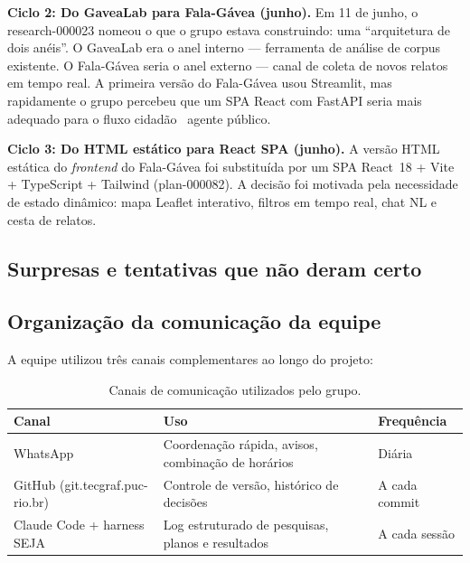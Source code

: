 \documentclass[12pt,a4paper]{article}
\begin{document}
\textbf{Ciclo 2: Do GaveaLab para Fala-Gávea (junho).}
Em 11 de junho, o research-000023 nomeou o que o grupo estava construindo: uma
``arquitetura de dois anéis''. O GaveaLab era o anel interno — ferramenta de análise de
corpus existente. O Fala-Gávea seria o anel externo — canal de coleta de novos relatos
em tempo real. A primeira versão do Fala-Gávea usou Streamlit, mas rapidamente o grupo
percebeu que um SPA React com FastAPI seria mais adequado para o fluxo cidadão~\textrightarrow{}
agente público.

\textbf{Ciclo 3: Do HTML estático para React SPA (junho).}
A versão HTML estática do \textit{frontend} do Fala-Gávea foi substituída por um SPA
React~18 + Vite + TypeScript + Tailwind (plan-000082). A decisão foi motivada pela
necessidade de estado dinâmico: mapa Leaflet interativo, filtros em tempo real, chat NL
e cesta de relatos.


\subsection{Surpresas e tentativas que não deram certo}






\subsection{Organização da comunicação da equipe}

A equipe utilizou três canais complementares ao longo do projeto:

\begin{table}[h!]
\centering
\begin{tabular}{lll}
\toprule
\textbf{Canal} & \textbf{Uso} & \textbf{Frequência} \\
\midrule
WhatsApp & Coordenação rápida, avisos, combinação de horários & Diária \\
GitHub (git.tecgraf.puc-rio.br) & Controle de versão, histórico de decisões & A cada commit \\
Claude Code + harness SEJA & Log estruturado de pesquisas, planos e resultados & A cada sessão \\
\bottomrule
\end{tabular}
\caption{Canais de comunicação utilizados pelo grupo.}
\end{table}
\end{document}
